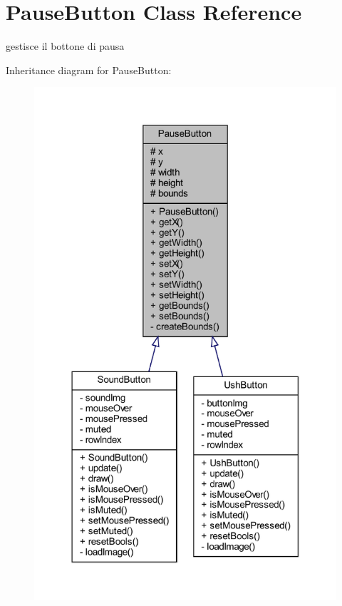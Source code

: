 \hypertarget{classui_1_1_pause_button}{}\section{Pause\+Button Class Reference}
\label{classui_1_1_pause_button}


gestisce il bottone di pausa  




Inheritance diagram for Pause\+Button\+:\nopagebreak
\begin{figure}[H]
\begin{center}
\leavevmode
\includegraphics[width=318pt]{classui_1_1_pause_button__inherit__graph}
\end{center}
\end{figure}


